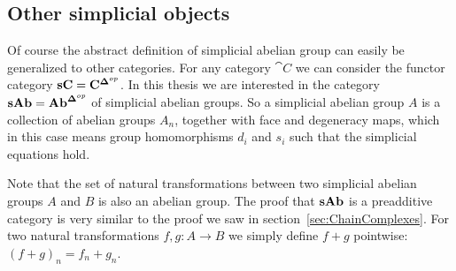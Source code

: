 
\subsection{Other simplicial objects}
Of course the abstract definition of simplicial abelian group can easily be generalized to other categories. For any category $\cat{C}$ we can consider the functor category $\mathbf{sC} = \mathbf{C}^{\mathbf{\Delta}^{op}}$. In this thesis we are interested in the category $\mathbf{sAb} = \mathbf{Ab}^{\mathbf{\Delta}^{op}}$ of simplicial abelian groups. So a simplicial abelian group $A$ is a collection of abelian groups $A_n$, together with face and degeneracy maps, which in this case means group homomorphisms $d_i$ and $s_i$ such that the simplicial equations hold.

Note that the set of natural transformations between two simplicial abelian groups $A$ and $B$ is also an abelian group. The proof that $\mathbf{sAb}$ is a preadditive category is very similar to the proof we saw in section~\ref{sec:ChainComplexes}. For two natural transformations $f,g: A \to B$ we simply define $f+g$ pointwise: $(f+g)_n = f_n + g_n$.

